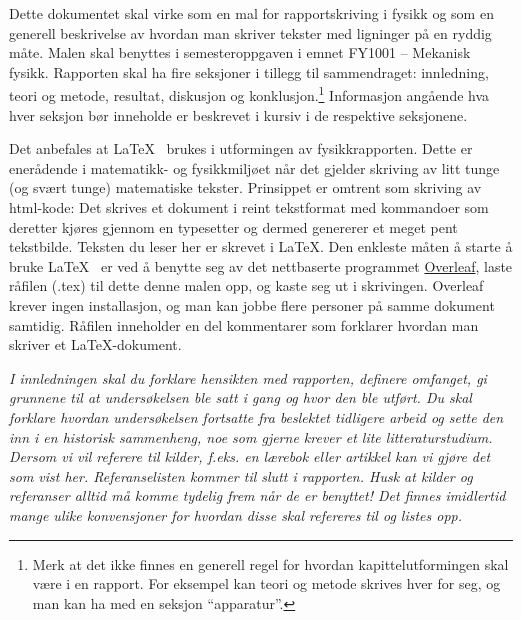 \documentclass[5p]{elsarticle}
\begin{document}

Dette dokumentet skal virke som en mal for rapportskriving i fysikk og som en generell
beskrivelse av hvordan man skriver tekster med ligninger på en ryddig måte. 
Malen skal benyttes i semesteroppgaven i emnet FY1001 -- Mekanisk fysikk.
Rapporten skal ha fire seksjoner i tillegg til sammendraget:
innledning, teori og metode, resultat, diskusjon og konklusjon.\footnote{
Merk at det ikke finnes en generell regel for hvordan kapittelutformingen skal være i en rapport.
For eksempel kan teori og metode skrives hver for seg, og man kan ha med en seksjon ``apparatur''.
}
Informasjon angående hva hver seksjon bør inneholde er beskrevet i kursiv i de respektive seksjonene.

%
%

Det anbefales at \LaTeX~ brukes i utformingen av fysikkrapporten.
Dette er enerådende i mate\-matikk- og fysikkmiljøet når det gjelder 
skriving av litt tunge (og svært tunge) matematiske tekster. 
Prinsippet er omtrent som skriving av html-kode: Det skrives 
et dokument i reint tekstformat med kommandoer som deretter kjøres
gjennom en typesetter og dermed genererer et meget pent tekstbilde. 
Teksten du leser her er skrevet i \LaTeX.
Den enkleste måten å starte å bruke \LaTeX~ er ved å benytte seg av det
nettbaserte programmet \href{https://www.overleaf.com}{Overleaf}, laste råfilen (.tex) til 
dette denne malen opp, og kaste seg ut i skrivingen.
Overleaf krever ingen installasjon, og man kan jobbe flere personer på samme dokument samtidig.
Råfilen inneholder en del kommentarer som forklarer hvordan man skriver et \LaTeX-dokument.


\textit{I innledningen skal du forklare hensikten med rapporten, definere omfanget, gi grunnene til at undersøkelsen 
ble satt i gang og hvor den ble utført. Du skal forklare hvordan undersøkelsen fortsatte fra beslektet tidligere 
arbeid og sette den inn i en historisk sammenheng, noe som gjerne krever et lite litteraturstudium.
Dersom vi vil referere til kilder, f.eks. en lærebok \cite{goldstein} eller artikkel \cite{Weinberg:1967tq}
kan vi gjøre det som vist her. Referanselisten kommer til slutt i rapporten. Husk at kilder og referanser alltid
må komme tydelig frem når de er benyttet! Det finnes imidlertid mange ulike konvensjoner for hvordan disse skal
refereres til og listes opp.}
\end{document}
